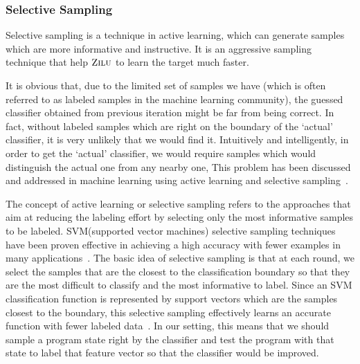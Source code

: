 \subsubsection{Selective Sampling}
Selective sampling is a technique in active learning, which can generate samples which are more informative and instructive.
It is an aggressive sampling technique that help $\textsc{Zilu}$ to learn the target much faster.

It is obvious that, due to the limited set of samples we have (which is often referred to as labeled samples in the machine learning community), 
the guessed classifier obtained from previous iteration might be far from being correct. 
In fact, without labeled samples which are right on the boundary of the `actual' classifier, 
it is very unlikely that we would find it. 
Intuitively and intelligently, in order to get the `actual' classifier, 
we would require samples which would distinguish the actual one from any nearby one, 
This problem has been discussed and addressed in machine learning using active learning and selective sampling~\cite{DBLP:conf/icml/SchohnC00}.

The concept of active learning or selective sampling refers to the approaches 
that aim at reducing the labeling effort by selecting only the most informative samples to be labeled. 
SVM(supported vector machines) selective sampling techniques have been proven effective in achieving a high accuracy 
with fewer examples in many applications~\cite{DBLP:conf/mm/TongC01,DBLP:journals/jmlr/TongK01}. 
The basic idea of selective sampling is that at each round, we select the samples that are the closest to the classification boundary 
so that they are the most difficult to classify and the most informative to label. 
Since an SVM classification function is represented by support vectors which are the samples closest to the boundary, 
this selective sampling effectively learns an accurate function with fewer labeled data~\cite{DBLP:conf/icml/SchohnC00}. 
In our setting, this means that we should sample a program state right by the classifier and test the program 
with that state to label that feature vector so that the classifier would be improved.


